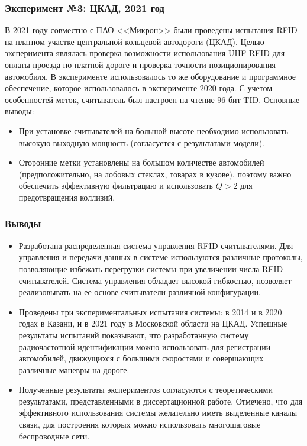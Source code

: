 \begin{frame}
    \frametitle{Эксперимент №3: ЦКАД, 2021 год}
    \footnotesize
    В 2021 году совместно с ПАО <<Микрон>> были проведены испытания RFID на платном участке центральной кольцевой автодороги (ЦКАД). Целью эксперимента являлась проверка возможности использования UHF RFID для оплаты проезда по платной дороге и проверка точности позиционирования автомобиля.
    \vfill
    В эксперименте использовалось то же оборудование и программное обеспечение, которое использовалось в эксперименте 2020 года. С учетом особенностей меток, считыватель был настроен на чтение 96 бит TID.
    \vfill
    Основные выводы:
    \begin{itemize}
        \item \footnotesize При установке считывателей на большой высоте необходимо использовать высокую выходную мощность (согласуется с результатами модели).
        \item Сторонние метки установлены на большом количестве автомобилей (предположительно, на лобовых стеклах, товарах в кузове), поэтому важно обеспечить эффективную фильтрацию и использовать $Q > 2$ для предотвращения коллизий.
    \end{itemize}
\end{frame}

\begin{frame}
    \frametitle{Выводы}
    \footnotesize
    \begin{itemize}
        \item Разработана распределенная система управления RFID-считывателями. Для управления и передачи данных в системе используются различные протоколы, позволяющие избежать перегрузки системы при увеличении числа RFID-считывателей. Система управления обладает высокой гибкостью, позволяет реализовывать на ее основе считыватели различной конфигурации.
        \item Проведены три экспериментальных испытания системы: в 2014 и в 2020 годах в Казани, и в 2021 году в Московской области на ЦКАД. Успешные результаты испытаний показывают, что разработанную систему радиочастотной идентификации можно использовать для регистрации автомобилей, движущихся с большими скоростями и совершающих различные маневры на дороге.
        \item Полученные результаты экспериментов согласуются с теоретическими результатами, представленными в диссертационной работе. Отмечено, что для эффективного использования системы желательно иметь выделенные каналы связи, для построения которых можно использовать многошаговые беспроводные сети.
    \end{itemize}
\end{frame}

